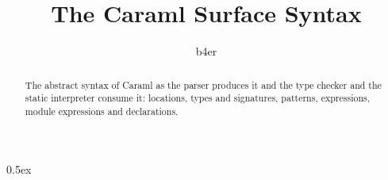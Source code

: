 \documentclass[11pt,a4paper]{article}
\begin{document}
\title{The Caraml Surface Syntax}
\author{b4er}
\maketitle

\begin{abstract}
  The abstract syntax of Caraml as the parser produces it and the type
  checker and the static interpreter consume it: locations, types and
  signatures, patterns, expressions, module expressions and declarations.
\end{abstract}

\tableofcontents

\parindent 0pt\parskip 0.5ex





\end{document}
